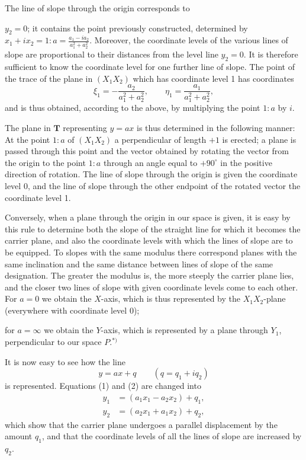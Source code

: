 \documentclass{article}
\begin{document}
The line of slope through the origin corresponds to

$y_2 = 0$; it contains the point previously constructed, determined by $x_1 + i x_2 = 1 : a = \frac{a_1 - i a_2}{a_1^2 + a_2^2}$. Moreover, the coordinate levels of the various lines of slope are proportional to their distances from the level line $y_2 = 0$. It is therefore sufficient to know the coordinate level for one further line of slope. The point of the trace of the plane in $(X_1 X_2)$ which has coordinate level 1 has coordinates
\[
\xi_1 = -\frac{a_2}{a_1^2 + a_2^2}, \qquad \eta_1 = \frac{a_1}{a_1^2 + a_2^2},
\]
and is thus obtained, according to the above, by multiplying the point $1 : a$ by $i$.

The plane in $\mathbf{T}$ representing $y = a x$ is thus determined in the following manner: At the point $1 : a$ of $(X_1 X_2)$ a perpendicular of length $+1$ is erected; a plane is passed through this point and the vector obtained by rotating the vector from the origin to the point $1 : a$ through an angle equal to $+90^\circ$ in the positive direction of rotation. The line of slope through the origin is given the coordinate level 0, and the line of slope through the other endpoint of the rotated vector the coordinate level 1.

Conversely, when a plane through the origin in our space is given, it is easy by this rule to determine both the slope of the straight line for which it becomes the carrier plane, and also the coordinate levels with which the lines of slope are to be equipped. To slopes with the same modulus there correspond planes with the same inclination and the same distance between lines of slope of the same designation. The greater the modulus is, the more steeply the carrier plane lies, and the closer two lines of slope with given coordinate levels come to each other. For $a = 0$ we obtain the $X$-axis, which is thus represented by the $X_1 X_2$-plane (everywhere with coordinate level 0);

for $a = \infty$ we obtain the $Y$-axis, which is represented by a plane through $Y_1$, perpendicular to our space $P$.${}^{*)}$

It is now easy to see how the line
\[
y = ax + q \qquad (q = q_1 + i q_2)
\]
is represented. Equations (1) and (2) are changed into
\[
\begin{aligned}
y_1 &= (a_1 x_1 - a_2 x_2) + q_1, \\
y_2 &= (a_2 x_1 + a_1 x_2) + q_2,
\end{aligned}
\]
which show that the carrier plane undergoes a parallel displacement by the amount $q_1$, and that the coordinate levels of all the lines of slope are increased by $q_2$.
\end{document}
